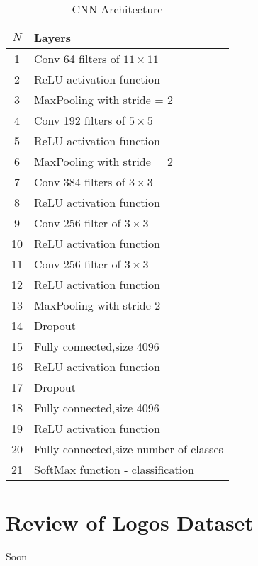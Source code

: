 \begin{table}[tbp]
	\centering
	\caption{CNN Architecture}
	\label{tab:sample}
	\begin{tabular}{cl}
		\toprule
		$N$ & Layers   \\
		\midrule
		1  & Conv 64 filters of $11\times 11$   \\
		2  & ReLU activation function   \\
		3  & MaxPooling with stride = 2  \\
		4  & Conv 192 filters of $5\times 5$ \\
		5  & ReLU activation function \\
		6  & MaxPooling with stride = 2 \\
		7  & Conv 384 filters of $3\times 3$ \\
		8  & ReLU activation function \\
		9  & Conv 256 filter of $3\times 3$ \\
		10 & ReLU activation function \\
		11 & Conv 256 filter of $3\times 3$ \\
		12 & ReLU activation function \\
		13 & MaxPooling with stride 2 \\ 
		14 & Dropout \\
		15 & Fully connected,size 4096 \\
		16 & ReLU activation function \\ 
		17 & Dropout \\ 
		18 & Fully connected,size 4096 \\
		19 & ReLU activation function \\
		20 & Fully connected,size number of classes \\
		21 & SoftMax function - classification \\
		
		
		\bottomrule
	\end{tabular}
\end{table}

\vspace{-0.3cm}


\section{Review of Logos Dataset}\label{sec:4.3}
\vspace{-0.5cm}
\noindent Soon

